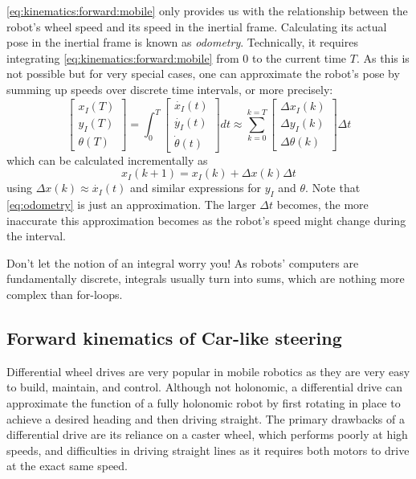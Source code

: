 \cref{eq:kinematics:forward:mobile} only provides us with the relationship between the robot's wheel speed and its speed in the inertial frame.
Calculating its actual pose in the inertial frame is known as \textsl{odometry}. Technically, it requires integrating \cref{eq:kinematics:forward:mobile} from 0 to the current time $T$.
As this is not possible but for very special cases, one can approximate the robot's pose by summing up speeds over discrete time intervals, or more precisely:
\begin{equation}
\left[\begin{array}{c} {x_I}(T)\\{y_I}(T)\\{\theta}(T)\end{array}\right]=
\int_0^T \left[\begin{array}{c} \dot{x_I}(t)\\\dot{y_I}(t)\\\dot{\theta}(t)\end{array}\right] dt \approx
\sum_{k=0}^{k=T}\left[\begin{array}{c} \Delta{x_I}(k)\\\Delta{y_I}(k)\\\Delta{\theta}(k)\end{array}\right]\Delta t
\end{equation} which can be calculated incrementally as
\begin{equation}\label{eq:odometry}
x_I(k+1)=x_I(k)+\Delta x (k) \Delta t
\end{equation}
using $\Delta x(k) \approx \dot{x_I}(t)$ and similar expressions for $y_I$ and $\theta$. Note that \cref{eq:odometry} is just an approximation. The larger $\Delta t$ becomes, the more inaccurate this approximation becomes as the robot's speed might change during the interval.

\begin{mdframed}
\noindent Don't let the notion of an integral worry you! As robots' computers are fundamentally discrete, integrals usually turn into sums, which are nothing more complex than for-loops.
\end{mdframed}

\subsection{Forward kinematics of Car-like steering}\label{sec:kinematics:fwk:car}

Differential wheel drives are very popular in mobile robotics as they are very easy to build, maintain, and control.
Although not holonomic, a differential drive can approximate the function of a fully holonomic robot by first rotating in place to achieve a desired heading and then driving straight.
The primary drawbacks of a differential drive are its reliance on a caster wheel, which performs poorly at high speeds, and difficulties in driving straight lines as it requires both motors to drive at the exact same speed.

